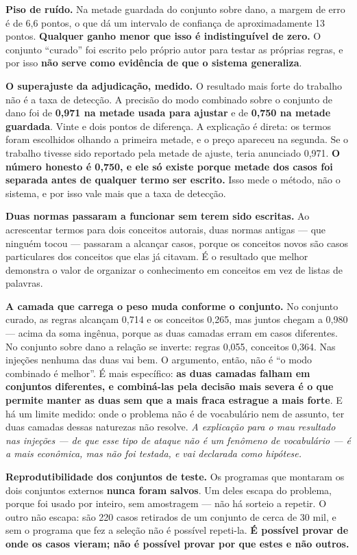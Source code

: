 \documentclass[10pt]{article}
\begin{document}
\textbf{Piso de ruído.} Na metade guardada do conjunto sobre dano, a margem de erro é de 6,6 pontos, o que dá um intervalo de confiança de aproximadamente 13 pontos. \textbf{Qualquer ganho menor que isso é indistinguível de zero.} O conjunto ``curado'' foi escrito pelo próprio autor para testar as próprias regras, e por isso \textbf{não serve como evidência de que o sistema generaliza}.

\textbf{O superajuste da adjudicação, medido.} O resultado mais forte do trabalho não é a taxa de detecção. A precisão do modo combinado sobre o conjunto de dano foi de \textbf{0,971 na metade usada para ajustar} e de \textbf{0,750 na metade guardada}. Vinte e dois pontos de diferença. A explicação é direta: os termos foram escolhidos olhando a primeira metade, e o preço apareceu na segunda. Se o trabalho tivesse sido reportado pela metade de ajuste, teria anunciado 0,971. \textbf{O número honesto é 0,750, e ele só existe porque metade dos casos foi separada antes de qualquer termo ser escrito.} Isso mede o método, não o sistema, e por isso vale mais que a taxa de detecção.

\textbf{Duas normas passaram a funcionar sem terem sido escritas.} Ao acrescentar termos para dois conceitos autorais, duas normas antigas --- que ninguém tocou --- passaram a alcançar casos, porque os conceitos novos são casos particulares dos conceitos que elas já citavam. É o resultado que melhor demonstra o valor de organizar o conhecimento em conceitos em vez de listas de palavras.

\textbf{A camada que carrega o peso muda conforme o conjunto.} No conjunto curado, as regras alcançam 0,714 e os conceitos 0,265, mas juntos chegam a 0,980 --- acima da soma ingênua, porque as duas camadas erram em casos diferentes. No conjunto sobre dano a relação se inverte: regras 0,055, conceitos 0,364. Nas injeções nenhuma das duas vai bem. O argumento, então, não é ``o modo combinado é melhor''. É mais específico: \textbf{as duas camadas falham em conjuntos diferentes, e combiná-las pela decisão mais severa é o que permite manter as duas sem que a mais fraca estrague a mais forte}. E há um limite medido: onde o problema não é de vocabulário nem de assunto, ter duas camadas dessas naturezas não resolve. \emph{A explicação para o mau resultado nas injeções --- de que esse tipo de ataque não é um fenômeno de vocabulário --- é a mais econômica, mas não foi testada, e vai declarada como hipótese.}

\textbf{Reprodutibilidade dos conjuntos de teste.} Os programas que montaram os dois conjuntos externos \textbf{nunca foram salvos}. Um deles escapa do problema, porque foi usado por inteiro, sem amostragem --- não há sorteio a repetir. O outro não escapa: são 220 casos retirados de um conjunto de cerca de 30 mil, e sem o programa que fez a seleção não é possível repeti-la. \textbf{É possível provar de onde os casos vieram; não é possível provar por que estes e não outros.}
\end{document}
